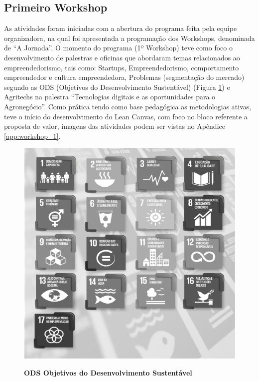 \subsection{Primeiro Workshop}

As atividades foram iniciadas com a abertura do programa feita pela equipe organizadora, na qual foi apresentada a programação dos Workshops, denominada de “A Jornada”. O momento do programa (1º Workshop) teve como foco o desenvolvimento de palestras e oficinas que abordaram temas relacionados ao empreendedorismo, tais como: Startups, Empreendedorismo, comportamento empreendedor e cultura empreendedora, Problemas (segmentação do mercado) segundo as ODS (Objetivos do Desenvolvimento Sustentável) (Figura \ref{fig:ods}) e Agritechs na palestra “Tecnologias digitais e as oportunidades para o Agronegócio”. Como prática tendo como base pedagógica as metodologias ativas, teve o início do desenvolvimento do Lean Canvas, com foco no bloco referente a proposta de valor, imagens das atividades podem ser vistas no Apêndice \ref{app:workshop_1}.

\begin{figure}[H]
\centering
\caption{\textbf{ODS Objetivos do Desenvolvimento Sustentável}}
\includegraphics[scale=0.15]{Imagens/ODS_GERAL.png}
\label{fig:ods}
\end{figure}


